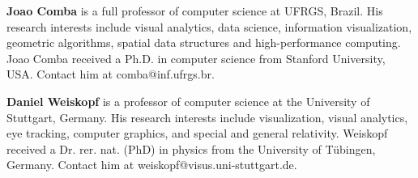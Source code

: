 \documentclass[10pt,journal,compsoc]{IEEEtran}
\begin{document}




\bigskip

\textbf{Joao Comba} is a full professor of computer science at UFRGS, Brazil. His research interests include visual analytics, data science, information visualization, geometric algorithms, spatial data structures and high-performance computing. Joao Comba received a Ph.D. in computer science from Stanford University, USA. Contact him at comba@inf.ufrgs.br.


\textbf{Daniel Weiskopf} is a professor of computer science at the University of Stuttgart, Germany. His research interests include visualization, visual analytics, eye tracking, computer graphics, and special and general relativity. Weiskopf received a Dr. rer. nat. (PhD) in physics from the University of T\"ubingen, Germany. Contact him at weiskopf@visus.uni-stuttgart.de.
\end{document}

